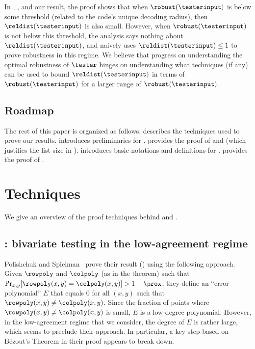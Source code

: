 \documentclass{toc}
\theoremstyle{plain}
\begin{document}
In \cite{Ben-SassonS06}, \cite{Viderman12}, and our result, the proof shows that when $\robust(\testerinput)$ is below some threshold (related to the code's unique decoding radius), then $\reldist(\testerinput)$ is also small. However, when $\robust(\testerinput)$ is not below this threshold, the analysis says nothing about $\reldist(\testerinput)$, and naively uses $\reldist(\testerinput) \leq 1$ to prove robustness in this regime. We believe that progress on understanding the optimal robustness of $\tester$ hinges on understanding what techniques (if any) can be used to bound $\reldist(\testerinput)$ in terms of $\robust(\testerinput)$ for a larger range of $\robust(\testerinput)$.

%
%
%
\subsection{Roadmap}
\label{sec:roadmap}

The rest of this paper is organized as follows.
 describes the techniques used to prove our results.
 introduces preliminaries for .
 provides the proof of  and   (which justifies the list size in ).
 introduces basic notations and definitions for .
 provides the proof of .



%
%
%
\section{Techniques}
\label{sec:techniques}

We give an overview of the proof techniques behind   and .

%
%
%
\subsection{: bivariate testing in the low-agreement regime}       %
\label{sec:techniques-2}

Polishchuk and Spielman~\cite{PolishchukS94} prove their result () using the following approach. Given $\rowpoly$ and $\colpoly$ (as in the theorem) such that $\Pr_{x,y}[\rowpoly(x,y) = \colpoly(x,y)] > 1 - \prox$, they define an ``error polynomial'' $E$ that equals 0 for all $(x,y)$ such that $\rowpoly(x,y) \neq \colpoly(x,y)$. Since the fraction of points where $\rowpoly(x,y) \neq \colpoly(x,y)$ is small, $E$ is a low-degree polynomial. However, in the low-agreement regime that we consider, the degree of $E$ is rather large, which seems to preclude their approach. In particular, a key step based on B\'{e}zout's Theorem in their proof appears to break down.
\end{document}
